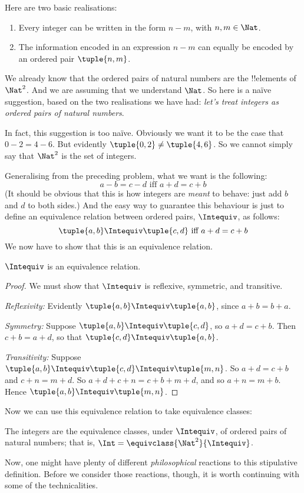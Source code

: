 \documentclass[../../../include/open-logic-section]{subfiles}
\begin{document}
	
\label{s:ArithmetisationNZ}
Here are two basic realisations:
	\begin{enumerate}
		\item Every integer can be written in the form $n - m$, with $n, m \in\Nat$.
		\item The information encoded in an expression $n - m$ can equally be encoded by an ordered pair $\tuple{n, m}$.
	\end{enumerate}
We already know that the ordered pairs of natural numbers are the !!{element}s of $\Nat^2$. And we are assuming that we understand $\Nat$. So here is a na\"{i}ve suggestion, based on the two realisations we have had: \emph{let's treat integers as ordered pairs of natural numbers}.

In fact, this suggestion is too na\"{i}ve. Obviously we want it to be the case that $0- 2 = 4 - 6$. But evidently $\tuple{0, 2 }\neq \tuple{4, 6}$. So we cannot simply say that $\Nat^2$ is the set of integers. 

Generalising from the preceding problem, what we want is the following:
	$$a - b = c - d \text{ iff }a + d = c + b$$
(It should be obvious that this is how integers are \emph{meant} to behave: just add $b$ and $d$ to both sides.) And the easy way to guarantee this behaviour is just to define an equivalence relation between ordered pairs, $\Intequiv$, as follows:
$$\tuple{ a, b } \Intequiv \tuple{c, d}\text{ iff }a + d = c + b$$  
We now have to show that this is an equivalence relation.
\begin{prop} $\Intequiv$ is an equivalence relation.
\end{prop}
	\begin{proof}
	We must show that $\Intequiv$ is reflexive, symmetric, and transitive. 
	
	\emph{Reflexivity:} Evidently $\tuple{a, b} \Intequiv \tuple{a, b}$, since $a + b = b + a$.
	
	\emph{Symmetry:} Suppose $\tuple{a, b} \Intequiv \tuple{c, d}$, so $a + d = c + b$. Then $c + b = a + d$, so that $\tuple{c, d} \Intequiv \tuple{a, b}$.
	
	\emph{Transitivity:} Suppose $\tuple{a, b} \Intequiv \tuple{c, d}\Intequiv \tuple{m, n}$. So $a + d = c + b$ and $c + n = m + d$. So $a + d + c + n = c + b + m + d$, and so $a + n = m + b$. Hence $\tuple{a, b } \Intequiv \tuple{m, n}$.		
\end{proof}\noindent
Now we can use this equivalence relation to take equivalence classes:
\begin{defn}
		The integers are the equivalence classes, under $\Intequiv$, of  ordered pairs of natural numbers; that is, $\Int = \equivclass{\Nat^2}{\Intequiv}$.
\end{defn}\noindent
Now, one might have plenty of different \emph{philosophical} reactions to this stipulative definition. Before we consider those reactions, though, it is worth continuing with some of the technicalities. 
\end{document}
